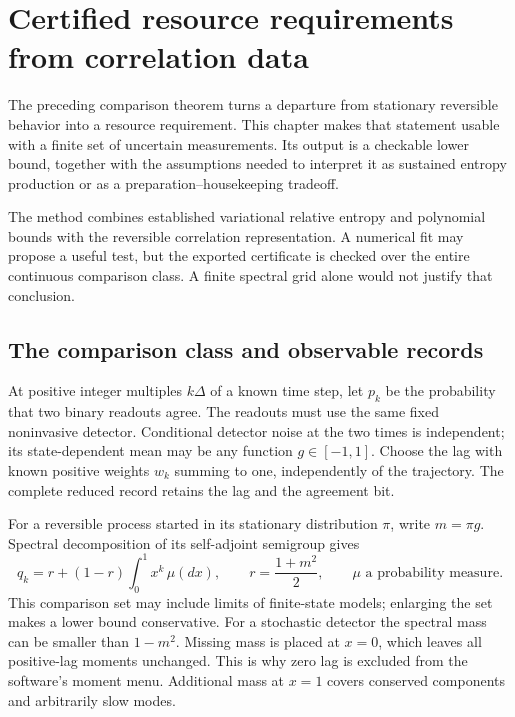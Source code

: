 \chapter{Certified resource requirements from correlation data}
\label{rf:dual}

The preceding comparison theorem turns a departure from stationary reversible
behavior into a resource requirement. This chapter makes that statement usable
with a finite set of uncertain measurements. Its output is a checkable lower
bound, together with the assumptions needed to interpret it as sustained
entropy production or as a preparation--housekeeping tradeoff.

The method combines established variational relative entropy and polynomial
bounds with the reversible correlation representation. A numerical fit may
propose a useful test, but the exported certificate is checked over the entire
continuous comparison class. A finite spectral grid alone would not justify
that conclusion.

\section{The comparison class and observable records}
At positive integer multiples $k\Delta$ of a known time step, let $p_k$ be the
probability that two binary readouts agree. The readouts must use the same fixed
noninvasive detector. Conditional detector noise at the two times is independent;
its state-dependent mean may be any function $g\in[-1,1]$. Choose the lag with
known positive weights $w_k$ summing to one, independently of the trajectory.
The complete reduced record retains the lag and the agreement bit.

For a reversible process started in its stationary distribution $\pi$, write
$m=\pi g$. Spectral decomposition of its self-adjoint semigroup gives
\begin{equation}
 q_k=r+(1-r)\int_0^1 x^k\,\mu(dx),\qquad
 r=\frac{1+m^2}{2},\qquad \mu\text{ a probability measure}.
 \label{rf:moment-cone}
\end{equation}
This comparison set may include limits of finite-state models; enlarging the
set makes a lower bound conservative. For a stochastic detector the spectral
mass can be smaller than $1-m^2$. Missing mass is placed at $x=0$, which leaves
all positive-lag moments unchanged. This is why zero lag is excluded from the
software's moment menu. Additional mass at $x=1$ covers conserved components
and arbitrarily slow modes.

